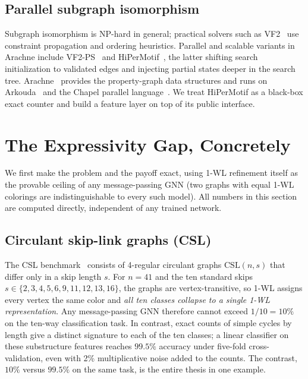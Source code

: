\documentclass[conference]{IEEEtran}
\begin{document}
\subsection{Parallel subgraph isomorphism}
Subgraph isomorphism is NP-hard in general; practical solvers such as
VF2~\cite{cordella2004vf2} use constraint propagation and ordering heuristics.
Parallel and scalable variants in Arachne include
VF2-PS~\cite{dindoost2024vf2ps} and HiPerMotif~\cite{dindoost2025hipermotif}, the
latter shifting search initialization to validated edges and injecting partial
states deeper in the search tree. Arachne~\cite{rodriguez2022arachne} provides the
property-graph data structures and runs on Arkouda~\cite{merrill2019arkouda} and
the Chapel parallel language~\cite{chamberlain2007chapel}. We treat HiPerMotif as a
black-box exact counter and build a feature layer on top of its public interface.

\section{The Expressivity Gap, Concretely}\label{sec:motivate}
We first make the problem and the payoff exact, using 1-WL refinement itself as the
provable ceiling of any message-passing GNN (two graphs with equal 1-WL colorings
are indistinguishable to every such model). All numbers in this section are
computed directly, independent of any trained network.

\subsection{Circulant skip-link graphs (CSL)}
The CSL benchmark~\cite{murphy2019relational,dwivedi2023benchmarking} consists of
4-regular circulant graphs $\mathrm{CSL}(n,s)$ that differ only in a skip length
$s$. For $n=41$ and the ten standard skips
$s\in\{2,3,4,5,6,9,11,12,13,16\}$, the graphs are vertex-transitive, so 1-WL
assigns every vertex the same color and \emph{all ten classes collapse to a single
1-WL representation}. Any message-passing GNN therefore cannot exceed $1/10=10\%$
on the ten-way classification task. In contrast, exact counts of simple cycles by
length give a distinct signature to each of the ten classes; a linear classifier on
these substructure features reaches $99.5\%$ accuracy under five-fold
cross-validation, even with 2\% multiplicative noise added to the counts. The
contrast, $10\%$ versus $99.5\%$ on the same task, is the entire thesis in one
example.
\end{document}
